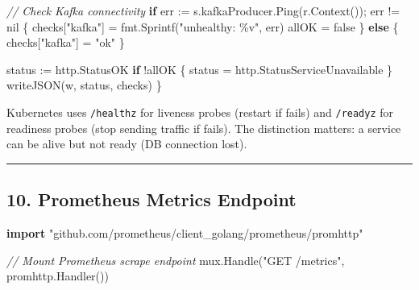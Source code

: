 \documentclass[
]{article}
\newenvironment{Shaded}{}{}
\newcommand{\CommentTok}[1]{\textcolor[rgb]{0.38,0.63,0.69}{\textit{#1}}}
\newcommand{\ControlFlowTok}[1]{\textcolor[rgb]{0.00,0.44,0.13}{\textbf{#1}}}
\newcommand{\KeywordTok}[1]{\textcolor[rgb]{0.00,0.44,0.13}{\textbf{#1}}}
\newcommand{\NormalTok}[1]{#1}
\newcommand{\OperatorTok}[1]{\textcolor[rgb]{0.40,0.40,0.40}{#1}}
\newcommand{\OtherTok}[1]{\textcolor[rgb]{0.00,0.44,0.13}{#1}}
\newcommand{\StringTok}[1]{\textcolor[rgb]{0.25,0.44,0.63}{#1}}
\begin{document}
\begin{Shaded}
\begin{Highlighting}[]
    \CommentTok{// Check Kafka connectivity}
    \ControlFlowTok{if}\NormalTok{ err }\OperatorTok{:=}\NormalTok{ s}\OperatorTok{.}\NormalTok{kafkaProducer}\OperatorTok{.}\NormalTok{Ping}\OperatorTok{(}\NormalTok{r}\OperatorTok{.}\NormalTok{Context}\OperatorTok{());}\NormalTok{ err }\OperatorTok{!=} \OtherTok{nil} \OperatorTok{\{}
\NormalTok{        checks}\OperatorTok{[}\StringTok{"kafka"}\OperatorTok{]} \OperatorTok{=}\NormalTok{ fmt}\OperatorTok{.}\NormalTok{Sprintf}\OperatorTok{(}\StringTok{"unhealthy: \%v"}\OperatorTok{,}\NormalTok{ err}\OperatorTok{)}
\NormalTok{        allOK }\OperatorTok{=} \OtherTok{false}
    \OperatorTok{\}} \ControlFlowTok{else} \OperatorTok{\{}
\NormalTok{        checks}\OperatorTok{[}\StringTok{"kafka"}\OperatorTok{]} \OperatorTok{=} \StringTok{"ok"}
    \OperatorTok{\}}

\NormalTok{    status }\OperatorTok{:=}\NormalTok{ http}\OperatorTok{.}\NormalTok{StatusOK}
    \ControlFlowTok{if} \OperatorTok{!}\NormalTok{allOK }\OperatorTok{\{}
\NormalTok{        status }\OperatorTok{=}\NormalTok{ http}\OperatorTok{.}\NormalTok{StatusServiceUnavailable}
    \OperatorTok{\}}
\NormalTok{    writeJSON}\OperatorTok{(}\NormalTok{w}\OperatorTok{,}\NormalTok{ status}\OperatorTok{,}\NormalTok{ checks}\OperatorTok{)}
\OperatorTok{\}}
\end{Highlighting}
\end{Shaded}

Kubernetes uses \texttt{/healthz} for liveness probes (restart if fails)
and \texttt{/readyz} for readiness probes (stop sending traffic if
fails). The distinction matters: a service can be alive but not ready
(DB connection lost).

\begin{center}\rule{0.5\linewidth}{0.5pt}\end{center}

\hypertarget{prometheus-metrics-endpoint}{%
\subsection{10. Prometheus Metrics
Endpoint}\label{prometheus-metrics-endpoint}}

\begin{Shaded}
\begin{Highlighting}[]
\KeywordTok{import} \StringTok{"github.com/prometheus/client\_golang/prometheus/promhttp"}

\CommentTok{// Mount Prometheus scrape endpoint}
\NormalTok{mux}\OperatorTok{.}\NormalTok{Handle}\OperatorTok{(}\StringTok{"GET /metrics"}\OperatorTok{,}\NormalTok{ promhttp}\OperatorTok{.}\NormalTok{Handler}\OperatorTok{())}
\end{Highlighting}
\end{Shaded}
\end{document}
